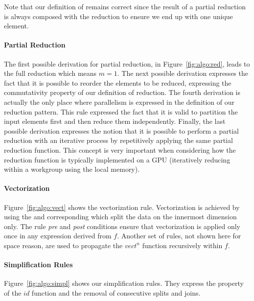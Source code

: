 Note that our definition of  remains correct since the result of a partial reduction is always composed with the reduction to ensure we end up with one unique element.

\paragraph{Partial Reduction}
The first possible derivation for partial reduction, in Figure~\ref{fig:algo:red}, leads to the full reduction which means $m=1$.
The next possible derivation expresses the fact that it is possible to reorder the elements to be reduced, expressing the commutativity property of our definition of reduction.
The fourth derivation is actually the only place where parallelism is expressed in the definition of our reduction pattern.
This rule expressed the fact that it is valid to partition the input elements first and then reduce them independently.
Finally, the last possible derivation expresses the notion that it is possible to perform a partial reduction with an iterative process by repetitively applying the same partial reduction function.
This concept is very important when considering how the reduction function is typically implemented on a GPU (iteratively reducing within a workgroup using the local memory).

\paragraph{Vectorization}
Figure~\ref{fig:algo:vect} shows the vectorization rule.
Vectorization is achieved by using the  and corresponding  which split the data on the innermost dimension only.
The rule \emph{pre} and \emph{post} conditions ensure that vectorization is applied only once in any expression derived from $f$.
Another set of rules, not shown here for space reason, are used to propagate the $vect^n$ function recursively within $f$.

\paragraph{Simplification Rules}
Figure~\ref{fig:algo:simpl} shows our simplification rules.
They express the property of the $id$ function and the removal of consecutive splits and joins.

